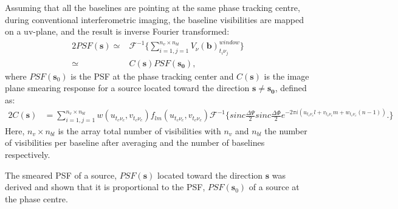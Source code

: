 Assuming that all the baselines are pointing at the same phase tracking centre, during conventional interferometric imaging,
the baseline visibilities are mapped on a uv-plane, and the result is inverse Fourier transformed:
\begin{alignat}{2}
PSF(\mathbf{s}) \simeq & \mathcal{F}^{-1}\Bigg\{\sum_{i=1,j=1}^{n_v\times n_{bl}}V_{\nu}(\mathbf{b})^{window}_{t_i \nu_j}\Bigg\}\\
		\simeq & C(\mathbf{s})PSF(\mathbf{s_0}),
\end{alignat}
where $PSF(\mathbf{s}_0)$ is the PSF at the phase tracking center
and $C(\mathbf{s})$ is the image plane smearing response for a source
located toward the direction $\mathbf{s}\neq \mathbf{s_0}$, defined as:
\begin{alignat}{2}
C(\mathbf{s}) &= \sum_{i=1,j=1}^{n_v\times n_{bl}}w(u_{t_c\nu_c},v_{t_c\nu_c})f_{lm}(u_{t_c\nu_c},v_{t_c\nu_c})\mathcal{F}^{-1}\Bigg\{sinc\frac{\Delta \Psi}{2}sinc\frac{\Delta \Phi}{2}e^{-2\pi i (u_{t_c\nu_c}l+v_{t_c\nu_c}m+w_{t_c\nu_c}(n-1))}.\Bigg\}
\end{alignat}
Here, $n_v\times n_{bl}$ is the array total number of visibilities with $n_v$ and $n_{bl}$ the number of visibilities per 
baseline after averaging and the number of baselines respectively.


The smeared PSF of a source, $PSF(\mathbf{s})$ located toward the
direction $\mathbf{s}$ was derived and shown that it is proportional
to the PSF, $PSF(\mathbf{s}_0)$ of a source at the phase centre.
% 
